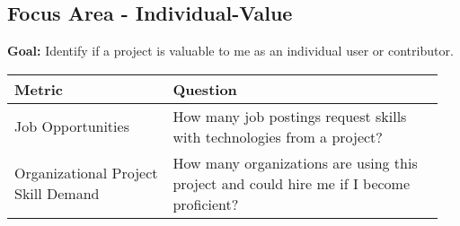 
\subsection{Focus Area - Individual-Value}
\textbf{Goal:} Identify if a project is valuable to me as an individual user or contributor.
\begin{table}[ht!]
    \centering
    \begin{tabular}{|p{0.35\linewidth} | p{0.6\linewidth}|}
        \hline
        \hfil \textbf{Metric}  & \hfil \textbf{Question} \\
        \hline
		Job Opportunities & How many job postings request skills with technologies from a project? \\ 
		\hline
		Organizational Project Skill Demand & How many organizations are using this project and could hire me if I become proficient? \\ 
		\hline
    \end{tabular}
\end{table}

 
 
